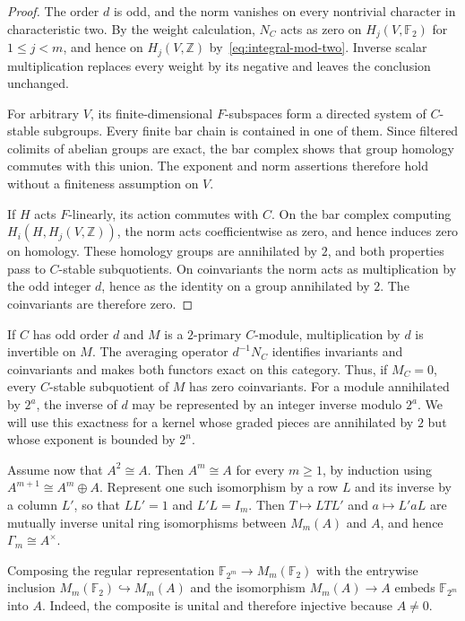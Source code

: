 \documentclass[11pt]{amsart}
\newcommand{\Z}{\mathbb Z}
\newcommand{\F}{\mathbb F}
\theoremstyle{definition}
\theoremstyle{remark}
\numberwithin{equation}{section}
\begin{document}
\begin{proof}
The order $d$ is odd, and the norm vanishes on every nontrivial character in characteristic two. By the weight calculation, $N_C$ acts as zero on $H_j(V,\F_2)$ for $1\leq j<m$, and hence on $H_j(V,\Z)$ by~\eqref{eq:integral-mod-two}. Inverse scalar multiplication replaces every weight by its negative and leaves the conclusion unchanged.

For arbitrary $V$, its finite-dimensional $F$-subspaces form a directed system of $C$-stable subgroups. Every finite bar chain is contained in one of them. Since filtered colimits of abelian groups are exact, the bar complex shows that group homology commutes with this union. The exponent and norm assertions therefore hold without a finiteness assumption on $V$.

If $H$ acts $F$-linearly, its action commutes with $C$. On the bar complex computing $H_i(H,H_j(V,\Z))$, the norm acts coefficientwise as zero, and hence induces zero on homology. These homology groups are annihilated by $2$, and both properties pass to $C$-stable subquotients. On coinvariants the norm acts as multiplication by the odd integer $d$, hence as the identity on a group annihilated by $2$. The coinvariants are therefore zero.
\end{proof}

If $C$ has odd order $d$ and $M$ is a $2$-primary $C$-module, multiplication by $d$ is invertible on $M$. The averaging operator $d^{-1}N_C$ identifies invariants and coinvariants and makes both functors exact on this category. Thus, if $M_C=0$, every $C$-stable subquotient of $M$ has zero coinvariants. For a module annihilated by $2^a$, the inverse of $d$ may be represented by an integer inverse modulo $2^a$. We will use this exactness for a kernel whose graded pieces are annihilated by $2$ but whose exponent is bounded by $2^n$.

Assume now that $A^2\cong A$. Then $A^m\cong A$ for every $m\geq1$, by induction using $A^{m+1}\cong A^m\oplus A$. Represent one such isomorphism by a row $L$ and its inverse by a column $L'$, so that $LL'=1$ and $L'L=I_m$. Then $T\mapsto LTL'$ and $a\mapsto L'aL$ are mutually inverse unital ring isomorphisms between $M_m(A)$ and $A$, and hence $\Gamma_m\cong A^\times$.

Composing the regular representation $\F_{2^m}\to M_m(\F_2)$ with the entrywise inclusion $M_m(\F_2)\hookrightarrow M_m(A)$ and the isomorphism $M_m(A)\to A$ embeds $\F_{2^m}$ into $A$. Indeed, the composite is unital and therefore injective because $A\neq0$.
\end{document}
